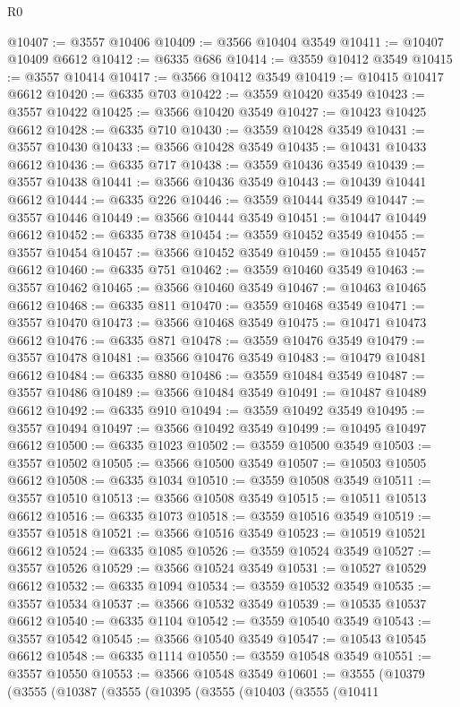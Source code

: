 \begin{lexlean}{R0}
\begin{coremodule}
@10407 := @3557 @10406
@10409 := @3566 @10404 @3549
@10411 := @10407 @10409 @6612
@10412 := @6335 @686
@10414 := @3559 @10412 @3549
@10415 := @3557 @10414
@10417 := @3566 @10412 @3549
@10419 := @10415 @10417 @6612
@10420 := @6335 @703
@10422 := @3559 @10420 @3549
@10423 := @3557 @10422
@10425 := @3566 @10420 @3549
@10427 := @10423 @10425 @6612
@10428 := @6335 @710
@10430 := @3559 @10428 @3549
@10431 := @3557 @10430
@10433 := @3566 @10428 @3549
@10435 := @10431 @10433 @6612
@10436 := @6335 @717
@10438 := @3559 @10436 @3549
@10439 := @3557 @10438
@10441 := @3566 @10436 @3549
@10443 := @10439 @10441 @6612
@10444 := @6335 @226
@10446 := @3559 @10444 @3549
@10447 := @3557 @10446
@10449 := @3566 @10444 @3549
@10451 := @10447 @10449 @6612
@10452 := @6335 @738
@10454 := @3559 @10452 @3549
@10455 := @3557 @10454
@10457 := @3566 @10452 @3549
@10459 := @10455 @10457 @6612
@10460 := @6335 @751
@10462 := @3559 @10460 @3549
@10463 := @3557 @10462
@10465 := @3566 @10460 @3549
@10467 := @10463 @10465 @6612
@10468 := @6335 @811
@10470 := @3559 @10468 @3549
@10471 := @3557 @10470
@10473 := @3566 @10468 @3549
@10475 := @10471 @10473 @6612
@10476 := @6335 @871
@10478 := @3559 @10476 @3549
@10479 := @3557 @10478
@10481 := @3566 @10476 @3549
@10483 := @10479 @10481 @6612
@10484 := @6335 @880
@10486 := @3559 @10484 @3549
@10487 := @3557 @10486
@10489 := @3566 @10484 @3549
@10491 := @10487 @10489 @6612
@10492 := @6335 @910
@10494 := @3559 @10492 @3549
@10495 := @3557 @10494
@10497 := @3566 @10492 @3549
@10499 := @10495 @10497 @6612
@10500 := @6335 @1023
@10502 := @3559 @10500 @3549
@10503 := @3557 @10502
@10505 := @3566 @10500 @3549
@10507 := @10503 @10505 @6612
@10508 := @6335 @1034
@10510 := @3559 @10508 @3549
@10511 := @3557 @10510
@10513 := @3566 @10508 @3549
@10515 := @10511 @10513 @6612
@10516 := @6335 @1073
@10518 := @3559 @10516 @3549
@10519 := @3557 @10518
@10521 := @3566 @10516 @3549
@10523 := @10519 @10521 @6612
@10524 := @6335 @1085
@10526 := @3559 @10524 @3549
@10527 := @3557 @10526
@10529 := @3566 @10524 @3549
@10531 := @10527 @10529 @6612
@10532 := @6335 @1094
@10534 := @3559 @10532 @3549
@10535 := @3557 @10534
@10537 := @3566 @10532 @3549
@10539 := @10535 @10537 @6612
@10540 := @6335 @1104
@10542 := @3559 @10540 @3549
@10543 := @3557 @10542
@10545 := @3566 @10540 @3549
@10547 := @10543 @10545 @6612
@10548 := @6335 @1114
@10550 := @3559 @10548 @3549
@10551 := @3557 @10550
@10553 := @3566 @10548 @3549
@10601 := @3555
    (@10379
      (@3555
        (@10387
          (@3555
            (@10395
              (@3555
                (@10403
                  (@3555
                    (@10411

\end{coremodule}
\end{lexlean}

